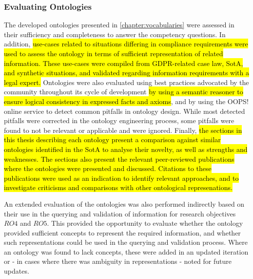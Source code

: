 \subsubsection{Evaluating Ontologies}
The developed ontologies presented in \autoref{chapter:vocabularies} were assessed in their sufficiency and completeness to answer the competency questions. 
In addition, \hl{use-cases related to situations differing in compliance requirements were used to assess the ontology in terms of sufficient representation of related information. These use-cases were compiled from GDPR-related case law, SotA, and synthetic situations, and validated regarding information requirements with a legal expert.}
Ontologies were also evaluated using best practices advocated by the community throughout its cycle of development \hl{by using a semantic reasoner to ensure logical consistency in expressed facts and axioms}, and by using the OOPS! \cite{poveda-villalon_oops!_2014} online service to detect common pitfalls in ontology design.
While most detected pitfalls were corrected in the ontology engineering process, some pitfalls were found to not be relevant or applicable and were ignored.
Finally, \hl{the sections in this thesis describing each ontology present a comparison against similar ontologies identified in the SotA to analyse their novelty, as well as strengths and weaknesses.
The sections also present the relevant peer-reviewed publications where the ontologies were presented and discussed. Citations to these publications were used as an indication to identify relevant approaches, and to investigate criticisms and comparisons with other ontological represenations.}

An extended evaluation of the ontologies was also performed indirectly based on their use in the querying and validation of information for research objectives $RO4$ and $RO5$. This provided the opportunity to evaluate whether the ontology provided sufficient concepts to represent the required information, and whether such representations could be used in the querying and validation process.
Where an ontology was found to lack concepts, these were added in an updated iteration or - in cases where there was ambiguity in representations - noted for future updates.

